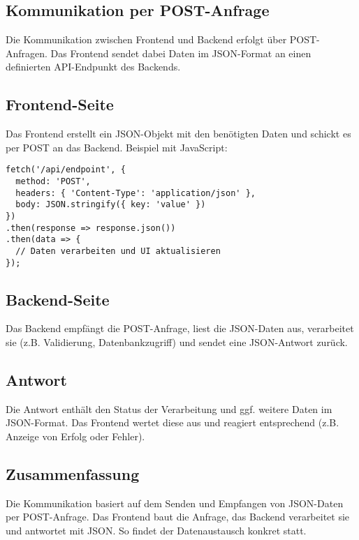 \subsection{Kommunikation per POST-Anfrage}

Die Kommunikation zwischen Frontend und Backend erfolgt über POST-Anfragen. Das Frontend sendet dabei Daten im JSON-Format an einen definierten API-Endpunkt des Backends.

\subsection{Frontend-Seite}

Das Frontend erstellt ein JSON-Objekt mit den benötigten Daten und schickt es per POST an das Backend. Beispiel mit JavaScript:

\begin{verbatim}
fetch('/api/endpoint', {
  method: 'POST',
  headers: { 'Content-Type': 'application/json' },
  body: JSON.stringify({ key: 'value' })
})
.then(response => response.json())
.then(data => {
  // Daten verarbeiten und UI aktualisieren
});
\end{verbatim}

\subsection{Backend-Seite}

Das Backend empfängt die POST-Anfrage, liest die JSON-Daten aus, verarbeitet sie (z.B. Validierung, Datenbankzugriff) und sendet eine JSON-Antwort zurück.

\subsection{Antwort}

Die Antwort enthält den Status der Verarbeitung und ggf. weitere Daten im JSON-Format. Das Frontend wertet diese aus und reagiert entsprechend (z.B. Anzeige von Erfolg oder Fehler).

\subsection{Zusammenfassung}

Die Kommunikation basiert auf dem Senden und Empfangen von JSON-Daten per POST-Anfrage. Das Frontend baut die Anfrage, das Backend verarbeitet sie und antwortet mit JSON. So findet der Datenaustausch konkret statt.
